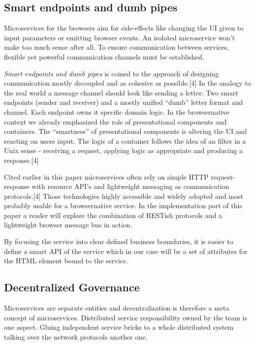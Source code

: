 \documentclass[]{article}
\begin{document}
\subsection{Smart endpoints and dumb
pipes}\label{smart-endpoints-and-dumb-pipes}

Microservices for the browsers aim for side-effects like changing the UI
given to input parameters or emitting browser events. An isolated
microservice won't make too much sense after all. To ensure
communication between services, flexible yet powerful communication
channels must be established.

\emph{Smart endpoints and dumb pipes} is coined to the approach of
designing communication mostly decoupled and as cohesive as
possible.{[}4{]} In the analogy to the real world a message channel
should look like sending a letter: Two smart endpoints (sender and
receiver) and a mostly unified ``dumb'' letter format and channel. Each
endpoint owns it specific domain logic. In the browsernative context we
already emphasized the role of presentational components and containers.
The ``smartness'' of presentational components is altering the UI and
reacting on users input. The logic of a container follows the idea of an
filter in a Unix sense - receiving a request, applying logic as
appropriate and producing a response.{[}4{]}

Cited earlier in this paper microservices often rely on simple HTTP
request-response with resource API's and lightweight messaging as
communication protocols.{[}4{]} Those technologies highly accessible and
widely adopted and most probably usable for a browsernative service. In
the implementation part of this paper a reader will explore the
combination of RESTish protocols and a lightweight browser message bus
in action.

By focusing the service into clear defined business boundaries, it is
easier to define a smart API of the service which in our case will be a
set of attributes for the HTML element bound to the service.

\subsection{Decentralized Governance}\label{decentralized-governance}

Microservices are separate entities and decentralization is therefore a
meta concept of microservices. Distributed service responsibility owned
by the team is one aspect. Gluing independent service bricks to a whole
distributed system talking over the network protocols another one.
\end{document}
